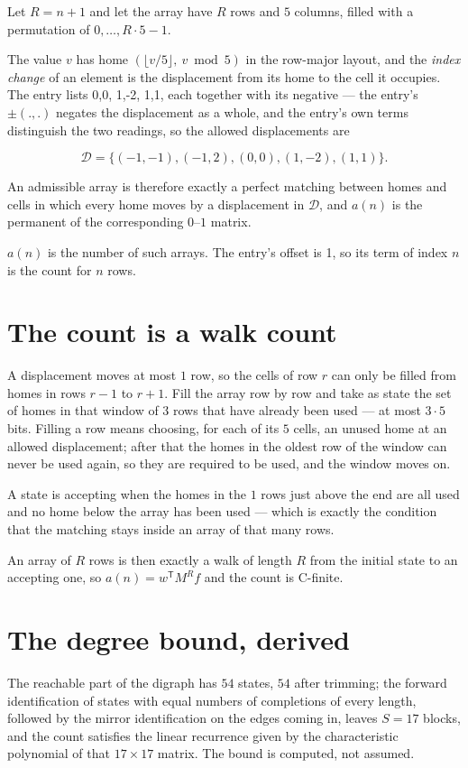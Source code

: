 \documentclass[11pt]{article}
\theoremstyle{definition}
\begin{document}
Let $R = n + 1$ and let the array have $R$ rows and $5$ columns, filled with a permutation of $0,\dots,R\cdot5-1$.

The value $v$ has home $(\lfloor v/5\rfloor,\ v \bmod 5)$ in the row-major layout, and the {\itshape index change} of an element is the displacement from its home to the cell it occupies. The entry lists 0,0, 1,-2, 1,1, each together with its negative --- the entry's $\pm(.,.)$ negates the displacement as a whole, and the entry's own terms distinguish the two readings, so the allowed displacements are

\[\mathcal{D} = \{(-1,-1), (-1,2), (0,0), (1,-2), (1,1)\}.\]

An admissible array is therefore exactly a perfect matching between homes and cells in which every home moves by a displacement in $\mathcal{D}$, and $a(n)$ is the permanent of the corresponding $0$--$1$ matrix.

$a(n)$ is the number of such arrays. The entry's offset is 1, so its term of index $n$ is the count for $n$ rows.

\section{The count is a walk count}

A displacement moves at most $1$ row, so the cells of row $r$ can only be filled from homes in rows $r-1$ to $r+1$. Fill the array row by row and take as state the set of homes in that window of $3$ rows that have already been used --- at most $3\cdot5$ bits. Filling a row means choosing, for each of its $5$ cells, an unused home at an allowed displacement; after that the homes in the oldest row of the window can never be used again, so they are required to be used, and the window moves on.

A state is accepting when the homes in the $1$ rows just above the end are all used and no home below the array has been used --- which is exactly the condition that the matching stays inside an array of that many rows.

An array of $R$ rows is then exactly a walk of length $R$ from the initial state to an accepting one, so $a(n) = w^{\mathsf T}M^{R}f$ and the count is C-finite.

\section{The degree bound, derived}

The reachable part of the digraph has $54$ states, $54$ after trimming; the forward identification of states with equal numbers of completions of every length, followed by the mirror identification on the edges coming in, leaves $S = 17$ blocks, and the count satisfies the linear recurrence given by the characteristic polynomial of that $17\times17$ matrix. The bound is computed, not assumed.
\end{document}
